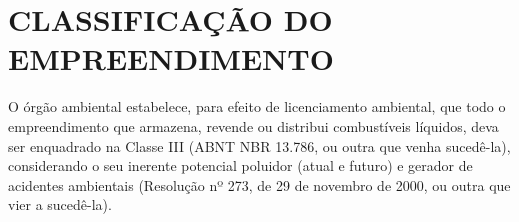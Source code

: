 \chapter{CLASSIFICAÇÃO DO EMPREENDIMENTO}
	
O órgão ambiental estabelece, para efeito de licenciamento
ambiental, que todo o empreendimento que armazena, revende
ou distribui combustíveis líquidos, deva ser enquadrado na
Classe III (ABNT NBR 13.786, ou outra que venha sucedê-la),
considerando o seu inerente potencial poluidor (atual e
futuro) e gerador de acidentes ambientais (Resolução nº
273, de 29 de novembro de 2000, ou outra que vier a
sucedê-la).